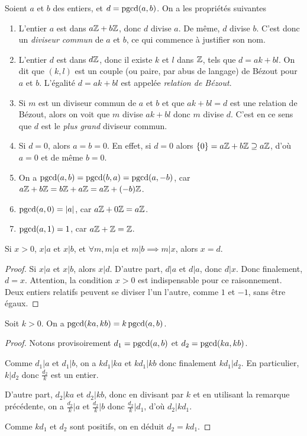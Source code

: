 \begin{proposition}
Soient $a$ et $b$ des entiers, et $d=\operatorname{pgcd}(a,b)$.
On a les propriétés suivantes
\begin{enumerate}
\item L'entier $a$ est dans $a\mathbb{Z}+b\mathbb{Z}$, donc $d$ divise $a$. De même, $d$ divise $b$. C'est donc un \emph{diviseur commun} de $a$ et $b$, ce qui commence à justifier son nom.
\item L'entier $d$ est dans $d\mathbb{Z}$, donc il existe $k$ et $l$ dans $\mathbb{Z}$, tels que $d = ak+bl$. On dit que $(k,l)$ est un couple (ou paire, par abus de langage) de Bézout pour $a$ et $b$. L'égalité $d=ak+bl$ est appelée \emph{relation de Bézout}.
\item Si $m$ est un diviseur commun de $a$ et $b$ et que $ak+bl=d$ est une relation de Bézout, alors on voit que $m$ divise $ak+bl$ donc $m$ divise $d$. C'est en ce sens que $d$ est le \emph{plus grand} diviseur commun.
\item Si $d=0$, alors $a=b=0$. En effet, si $d=0$ alors $\{0\}=a\mathbb{Z}+b\mathbb{Z}\supseteq a\mathbb{Z}$, d'où $a=0$ et de même $b=0$.
\item On a $\operatorname{pgcd}(a,b)=\operatorname{pgcd}(b,a) = \operatorname{pgcd}(a,-b)$, car $a\mathbb{Z}+b\mathbb{Z} = b\mathbb{Z}+a\mathbb{Z}=a\mathbb{Z}+(-b)\mathbb{Z}$.
\item $\operatorname{pgcd}(a,0)=|a|$, car $a\mathbb{Z}+0\mathbb{Z} = a\mathbb{Z}$.
\item $\operatorname{pgcd}(a,1)=1$, car $a\mathbb{Z}+\mathbb{Z} = \mathbb{Z}$.
\end{enumerate}
\end{proposition}

\begin{proposition}
Si $x>0$, $x|a$ et $x|b$, et $\forall m, m|a \text{ et } m|b \implies m|x$, alors $x=d$.
\end{proposition}
\begin{proof}
Si $x|a$ et $x|b$, alors $x|d$. D'autre part, $d|a$ et $d|a$, donc $d|x$. Donc finalement, $d=x$.
Attention, la condition $x>0$ est indispensable pour ce raisonnement. Deux entiers relatifs peuvent se diviser l'un l'autre, comme $1$ et $-1$, sans être égaux.
\end{proof}

\begin{proposition}
Soit $k>0$. On a $\operatorname{pgcd}(ka,kb)=k\operatorname{pgcd}(a,b)$.
\end{proposition}
\begin{proof}
Notons provisoirement $d_1 = \operatorname{pgcd}(a,b)$ et $d_2 = \operatorname{pgcd}(ka,kb)$.

Comme $d_1|a$ et $d_1|b$, on a $kd_1|ka$ et $kd_1|kb$ donc finalement $kd_1|d_2$. En  particulier, $k|d_2$ donc $\frac{d_2}{k}$ est un entier.

D'autre part, $d_2|ka$ et $d_2|kb$, donc  en divisant par $k$ et en utilisant la remarque précédente, on a $\frac{d_2}{k} | a$ et $\frac{d_2}{k} | b$ donc $\frac{d_2}{k} | d_1$, d'où $d_2 | kd_1$. 

Comme $kd_1$ et $d_2$ sont positifs, on en déduit $d_2=kd_1$.
\end{proof}

